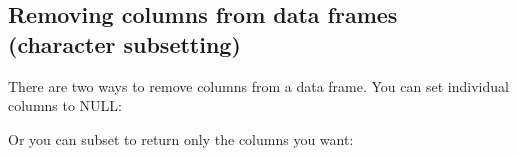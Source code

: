 \begin{Shaded}
\begin{Highlighting}[]
\StringTok{ }\NormalTok{(} \NormalTok{(}\NormalTok{, }\NormalTok{, }\NormalTok{), } \NormalTok{(}\NormalTok{, }\NormalTok{, }\NormalTok{), } \NormalTok{(}\NormalTok{, }\NormalTok{, }\NormalTok{))}
\NormalTok{(}\NormalTok{:}
\NormalTok{df[}\NormalTok{(}\NormalTok{:}\NormalTok{(df), df$n), ]}
\end{Highlighting}
\end{Shaded}

\subsection{Removing columns from data frames (character subsetting)}

There are two ways to remove columns from a data frame. You can set
individual columns to NULL: 

\begin{Shaded}
\begin{Highlighting}[]
\StringTok{ }\NormalTok{(} \NormalTok{:}\NormalTok{, } \NormalTok{:}\NormalTok{, } \NormalTok{letters[}\NormalTok{:}\NormalTok{])}
\StringTok{ }
\end{Highlighting}
\end{Shaded}

Or you can subset to return only the columns you want:

\begin{Shaded}
\begin{Highlighting}[]
\StringTok{ }\NormalTok{(} \NormalTok{:}\NormalTok{, } \NormalTok{:}\NormalTok{, } \NormalTok{letters[}\NormalTok{:}\NormalTok{])}
\NormalTok{df[}\NormalTok{(}\NormalTok{, }\NormalTok{)]}
\end{Highlighting}
\end{Shaded}

